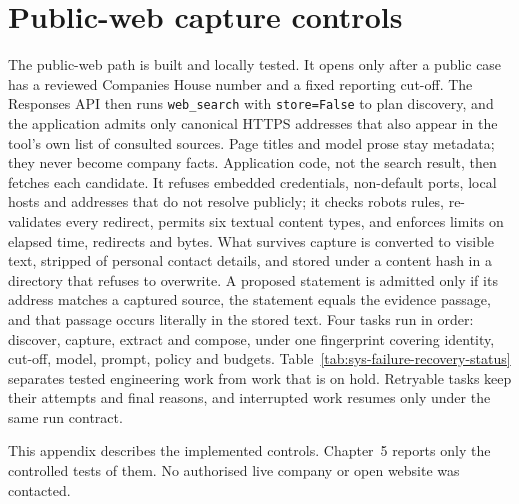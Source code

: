 \section*{Public-web capture controls}

The public-web path is built and locally tested. It opens only after a public case has a reviewed
Companies House number and a fixed reporting cut-off. The Responses API then runs
\texttt{web\_search} with \texttt{store=False} to plan discovery, and the application admits only
canonical HTTPS addresses that also appear in the tool's own list of consulted sources. Page titles
and model prose stay metadata; they never become company facts. Application code, not the search
result, then fetches each candidate. It refuses embedded credentials, non-default ports, local hosts
and addresses that do not resolve publicly; it checks robots rules, re-validates every redirect,
permits six textual content types, and enforces limits on elapsed time, redirects and bytes. What
survives capture is converted to visible text, stripped of personal contact details, and stored
under a content hash in a directory that refuses to overwrite. A proposed statement is admitted only
if its address matches a captured source, the statement equals the evidence passage, and that
passage occurs literally in the stored text. Four tasks run in order: discover, capture, extract
and compose, under one fingerprint covering identity, cut-off, model, prompt, policy and budgets.
Table~\ref{tab:sys-failure-recovery-status} separates tested engineering work from work that is on
hold. Retryable tasks keep their attempts and final reasons, and interrupted work resumes only
under the same run contract.

This appendix describes the implemented controls. Chapter~5 reports only the controlled tests of
them. No authorised live company or open website was contacted.
